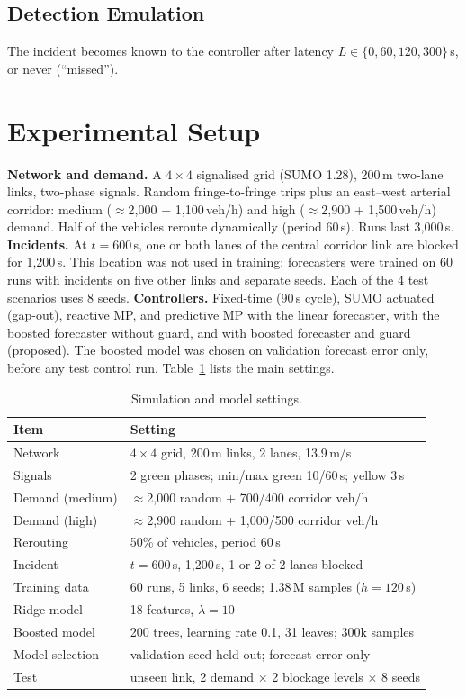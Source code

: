 \documentclass[conference]{IEEEtran}
\begin{document}
\subsection{Detection Emulation}
The incident becomes known to the controller after latency $L\in\{0,60,120,300\}$\,s, or never (``missed'').

\section{Experimental Setup}
\textbf{Network and demand.} A $4\times4$ signalised grid (SUMO 1.28), 200\,m two-lane links, two-phase signals. Random fringe-to-fringe trips plus an east--west arterial corridor: medium ($\approx$2{,}000 + 1{,}100\,veh/h) and high ($\approx$2{,}900 + 1{,}500\,veh/h) demand. Half of the vehicles reroute dynamically (period 60\,s). Runs last 3{,}000\,s.
\textbf{Incidents.} At $t=600$\,s, one or both lanes of the central corridor link are blocked for 1{,}200\,s. This location was not used in training: forecasters were trained on 60 runs with incidents on five other links and separate seeds. Each of the 4 test scenarios uses 8 seeds.
\textbf{Controllers.} Fixed-time (90\,s cycle), SUMO actuated (gap-out), reactive MP, and predictive MP with the linear forecaster, with the boosted forecaster without guard, and with boosted forecaster and guard (proposed). The boosted model was chosen on validation forecast error only, before any test control run.
Table~\ref{tab:param} lists the main settings.

\begin{table}[!htbp]
\centering
\caption{Simulation and model settings.}
\label{tab:param}
\setlength{\tabcolsep}{3pt}
\begin{tabular}{@{}ll@{}}
\toprule
Item & Setting \\
\midrule
Network & $4\times4$ grid, 200\,m links, 2 lanes, 13.9\,m/s \\
Signals & 2 green phases; min/max green 10/60\,s; yellow 3\,s \\
Demand (medium) & $\approx$2{,}000 random + 700/400 corridor veh/h \\
Demand (high) & $\approx$2{,}900 random + 1{,}000/500 corridor veh/h \\
Rerouting & 50\% of vehicles, period 60\,s \\
Incident & $t=600$\,s, 1{,}200\,s, 1 or 2 of 2 lanes blocked \\
Training data & 60 runs, 5 links, 6 seeds; 1.38\,M samples ($h=120$\,s) \\
Ridge model & 18 features, $\lambda=10$ \\
Boosted model & 200 trees, learning rate 0.1, 31 leaves; 300k samples \\
Model selection & validation seed held out; forecast error only \\
Test & unseen link, 2 demand $\times$ 2 blockage levels $\times$ 8 seeds \\
\bottomrule
\end{tabular}
\end{table}
\end{document}
